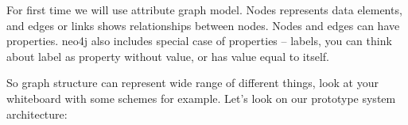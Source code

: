 \secdown

For first time we will use attribute graph model. Nodes represents data elements, and edges or links shows relationships between nodes. Nodes and edges can have properties. neo4j also includes special case of properties -- labels, you can think about label as property without value, or has value equal to itself.

So graph structure can represent wide range of different things, look at your whiteboard with some schemes for example. Let’s look on our prototype system architecture:


\secup
